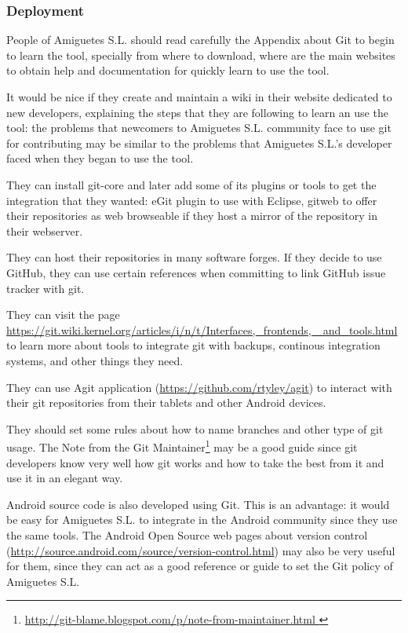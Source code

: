\documentclass[a4paper,10pt]{article}
\begin{document}
\subsubsection{Deployment}

People of Amiguetes S.L. should read carefully the Appendix about Git to begin
to learn the tool, specially from where to download, where are the main
websites to obtain help and documentation for quickly learn to use the tool.

It would be nice if they create and maintain a wiki in their website dedicated
to new developers, explaining the steps that they are following to learn an use
the tool: the problems that newcomers to Amiguetes S.L. community face to use
git for contributing may be similar to the problems that Amiguetes S.L.'s
developer faced when they began to use the tool.

They can install git-core and later add some of its plugins or tools to get
the integration that they wanted: eGit plugin to use with Eclipse, gitweb to
offer their repositories as web browseable if they host a mirror of the
repository in their webserver.

They can host their repositories in many software forges. If they decide to use
GitHub, they can use certain references when committing to link GitHub issue
tracker with git.

They can visit the page
\url{https://git.wiki.kernel.org/articles/i/n/t/Interfaces,_frontends,
_and_tools.html} to learn more about tools to integrate git with backups,
continous integration systems, and other things they need. 

They can use Agit application (\url{https://github.com/rtyley/agit}) to interact
with their git repositories from their tablets and other Android devices.

They should set some rules about how to name branches and other type of
git usage. The Note from the Git
Maintainer\footnote{\url{
http://git-blame.blogspot.com/p/note-from-maintainer.html } } may be a good
guide since git developers know very well how git works and how to take the
best from it and use it in an elegant way.

Android source code is also developed using Git. This is an advantage: it
would be easy for Amiguetes S.L. to integrate in the Android community since
they use the same tools. The Android Open Source web pages about version
control (\url{http://source.android.com/source/version-control.html}) may also
be very useful for them, since they can act as a good reference or guide to set
the Git policy of Amiguetes S.L. 
\end{document}
